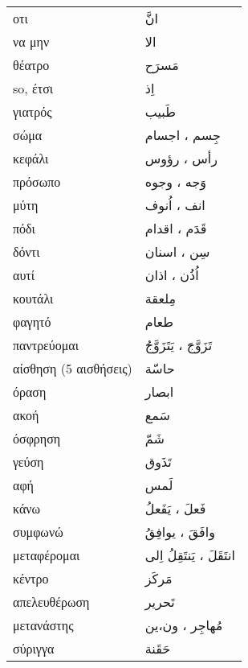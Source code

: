 \documentclass[twocolumn,a4paper]{article}
\newcommand{\ar}[1]{\textarabic{#1}}
\newcommand{\pl}{\raisebox{0.15ex}{\footnotesize ◍}}
\newcommand{\mfnormpl}[1]{\ar{ #1، ون،ين }}
\newcommand{\vrf}{\raisebox{0.15ex}{\footnotesize ◉}}
\begin{document}
\begin{mpsupertabular}{ P{0.5\textwidth} P{0.5\textwidth} }
οτι                          & \ar{ انَّ } \\
να μην                       & \ar{ الا } \\

θέατρο                       & \ar{ مَسرَح } \\
so, έτσι                     & \ar{ اِذ } \\
γιατρός                      & \ar{ طَبيب } \\
σώμα \pl                     & \ar{ جِسم ، اجسام } \\
κεφάλι \pl                   & \ar{ رأس ، رؤوس } \\
πρόσωπο \pl                  & \ar{ وَجه ، وجوه } \\
μύτη \pl                     & \ar{ انف ، اُنوف } \\
πόδι \pl                     & \ar{ قَدَم ، اقدام } \\
δόντι \pl                    & \ar{ سِن ، اسنان } \\
αυτί \pl                     & \ar{ اُذُن ، اذان } \\
κουτάλι                      & \ar{ مِلعقة } \\
φαγητό                       & \ar{ طعام } \\
παντρεύομαι \vrf             & \ar{ تَزَوَّجَ ، يَتَزَوَّجُ } \\ %
αίσθηση (5 αισθήσεις)        & \ar{ حاسّة } \\
όραση                        & \ar{ ابصار } \\
ακοή                         & \ar{ سَمع } \\
όσφρηση                      & \ar{ شَمّ } \\
γεύση                        & \ar{ تَذَوق } \\
αφή                          & \ar{ لَمس } \\
κάνω \vrf                    & \ar{ فَعلَ ، يَفَعلُ } \\ %
συμφωνώ \vrf                 & \ar{ وافَقَ ، يوافِقُ } \\ %
μεταφέρομαι \vrf             & \ar{ انتَقَلَ ، يَنتَقِلُ اِلى} \\ %
κέντρο                       & \ar{ مَركَز } \\
απελευθέρωση                 & \ar{ تَحرير } \\
μετανάστης  \pl              & \mfnormpl{ مُهاجِر } \\
σύριγγα                      & \ar{ حَقَنة } \\

\end{mpsupertabular}
\end{document}
